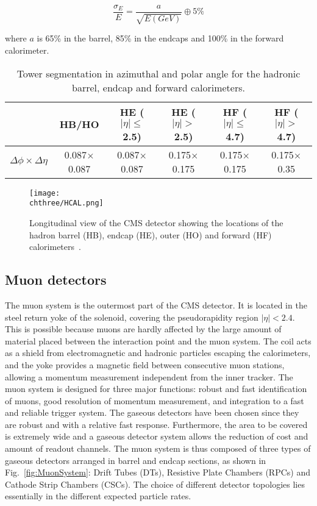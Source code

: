 \begin{equation}
\frac{\sigma_E}{E} = \frac{a}{\sqrt{E(GeV)}} \oplus 5\%
\end{equation}

where $a$ is 65\% in the barrel, 85\% in the endcaps and 100\% in the forward calorimeter.

\begin{table}[!htb]
\centering
\caption{Tower segmentation in azimuthal and polar angle for the hadronic barrel, endcap and forward calorimeters.}
\begin{tabular}{c|c|c|c|c|c}
                                              & HB/HO                      & HE ($|\eta|\leq$2.5) & HE ($|\eta|>$2.5)     & HF ($|\eta|\leq$4.7) & HF ($|\eta|>$4.7) \\ \hline\hline
$\Delta\phi\times\Delta\eta$  & 0.087$\times$0.087 & 0.087$\times$0.087 & 0.175$\times$0.175 & 0.175$\times$0.175 & 0.175$\times$0.35
\end{tabular}
\label{tab:hcal}
\end{table}

\begin{figure}[!htb]
 \begin{center}
  \texttt{[image: \\chthree/HCAL.png]}
 \end{center}
 \caption{Longitudinal view of the CMS detector showing the locations of the hadron barrel (HB), endcap (HE), outer (HO) and forward (HF) calorimeters~\cite{Chatrchyan:2008zzk}.}
 \label{fig:HCALLayout}
\end{figure}

\subsection{Muon detectors}\label{subsec:muonchambers}

The muon system is the outermost part of the CMS detector. It is located in the steel return yoke of the solenoid, covering the pseudorapidity region $|\eta| < 2.4$. This is possible because muons are hardly affected by the large amount of material placed between the interaction point and the muon system. The coil acts as a shield from electromagnetic and hadronic particles escaping the calorimeters, and the yoke provides a magnetic field between consecutive muon stations, allowing a momentum measurement independent from the inner tracker. The muon system is designed for three major functions: robust and fast identification of muons, good resolution of momentum measurement, and integration to a fast and reliable trigger system. The gaseous detectors have been chosen since they are robust and with a relative fast response. Furthermore, the area to be covered is extremely wide and a gaseous detector system allows the reduction of cost and amount of readout channels. The muon system is thus composed of three types of gaseous detectors arranged in barrel and endcap sections, as shown in Fig.~\ref{fig:MuonSystem}: Drift Tubes (DTs), Resistive Plate Chambers (RPCs) and Cathode Strip Chambers (CSCs). The choice of different detector topologies lies essentially in the different expected particle rates. 

